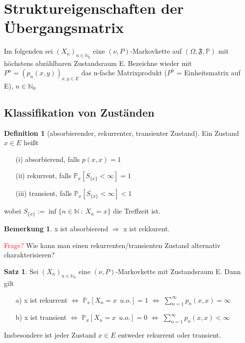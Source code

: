 \documentclass[a4paper,12pt]{scrartcl}
\theoremstyle{definition}
\newtheorem{bem}{Bemerkung}[section]
\newtheorem{sat}{Satz}[section]
\newtheorem{defi}{Definition}[section]
\begin{document}
\section{Struktureigenschaften der Übergangsmatrix}
Im folgenden sei $(X_{n})_{n \in \mathbb{N}_{0}}$ eine $(\nu,P)$-Markovkette auf $(\Omega, \mathfrak{F},\mathbb{P})$ mit höchstens abzählbaren Zustandsraum E. Bezeichne wieder mit $P^{n} = (p_{n}(x,y))_{x,y \in E}$ das n-fache Matrixprodukt ($P^{0}$ = Einheitsmatrix auf E), $n \in \mathbb{N}_{0}$
\subsection{Klassifikation von Zuständen}
\begin{defi}[absorbierender, rekurrenter, transienter Zustand]
Ein Zustand $x \in E$ heißt
\begin{itemize}
\item[(i)] absorbierend, falls $p(x,x)=1$
\item[(ii)] rekurrent, falls $\mathbb{P}_{x}[S_{\lbrace x \rbrace} < \infty] = 1$
\item[(iii)] transient, falls $\mathbb{P}_{x}[S_{\lbrace x \rbrace} < \infty] < 1$
\end{itemize}
wobei $S_{\lbrace x \rbrace} := \inf \lbrace n \in \mathbb{N} \: : \: X_{n} = x \rbrace$ die Treffzeit ist. 
\end{defi}
\begin{bem}
x ist absorbierend $\Rightarrow$ x ist rekkurent.
\end{bem}
\noindent
\textcolor{red}{Frage?} Wie kann man einen rekurrenten/transienten Zustand alternativ charakterisieren?
\clearpairofpagestyles
\ohead{\pagemark}
\pagestyle{scrheadings}
\begin{sat}
\label{alternative Chrakterisierung von rekurrent/transient}
Sei $(X_{n})_{n \in \mathbb{N}_{0}}$ eine $(\nu,P)$-Markovkette mit Zustandsraum E. Dann gilt
\begin{itemize}
\item[a)] x ist rekurrent $\Leftrightarrow$ $\mathbb{P}_{x}[X_{n} = x \: \: u.o.] = 1$ $\Leftrightarrow$ $\sum_{n=1}^{\infty} p_{n}(x,x) = \infty$
\item[b)] x ist transient $\Leftrightarrow$ $\mathbb{P}_{x}[X_{n} = x \: \: u.o.] = 0$ $\Leftrightarrow$ $\sum_{n=1}^{\infty} p_{n}(x,x) < \infty$
\end{itemize}
Insbesondere ist jeder Zustand $x \in E$ entweder rekurrent oder transient.
\end{sat}
\end{document}

